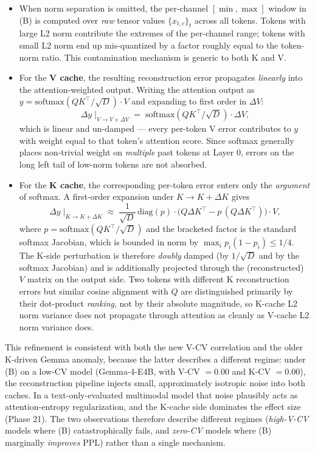\begin{itemize}
\tightlist
\item
  When norm separation is omitted, the per-channel \([\min, \max]\)
  window in (B) is computed over \emph{raw} tensor values
  \(\{x_{t, c}\}_{t}\) across all tokens. Tokens with large L2 norm
  contribute the extremes of the per-channel range; tokens with small L2
  norm end up mis-quantized by a factor roughly equal to the token-norm
  ratio. This contamination mechanism is generic to both K and V.
\item
  For the \textbf{V cache}, the resulting reconstruction error
  propagates \emph{linearly} into the attention-weighted output. Writing
  the attention output as
  \(y = \mathrm{softmax}(QK^\top / \sqrt{D}) \cdot V\) and expanding to
  first order in \(\Delta V\): \[
  \Delta y \;\big|_{V \to V + \Delta V} \;=\; \mathrm{softmax}(QK^\top / \sqrt{D}) \cdot \Delta V,
  \] which is linear and un-damped --- every per-token V error
  contributes to \(y\) with weight equal to that token's attention
  score. Since softmax generally places non-trivial weight on
  \emph{multiple} past tokens at Layer 0, errors on the long left tail
  of low-norm tokens are not absorbed.
\item
  For the \textbf{K cache}, the corresponding per-token error enters
  only the \emph{argument} of softmax. A first-order expansion under
  \(K \to K + \Delta K\) gives \[
  \Delta y \;\big|_{K \to K + \Delta K} \;\approx\; \frac{1}{\sqrt{D}}\,\mathrm{diag}(p) \cdot \bigl(Q \Delta K^\top - p\,(Q \Delta K^\top)\bigr) \cdot V,
  \] where \(p = \mathrm{softmax}(QK^\top / \sqrt{D})\) and the
  bracketed factor is the standard softmax Jacobian, which is bounded in
  norm by \(\max_i p_i (1 - p_i) \leq 1/4\). The K-side perturbation is
  therefore \emph{doubly} damped (by \(1/\sqrt{D}\) and by the softmax
  Jacobian) and is additionally projected through the (reconstructed)
  \(V\) matrix on the output side. Two tokens with different K
  reconstruction errors but similar cosine alignment with \(Q\) are
  distinguished primarily by their dot-product \emph{ranking}, not by
  their absolute magnitude, so K-cache L2 norm variance does not
  propagate through attention as cleanly as V-cache L2 norm variance
  does.
\end{itemize}

This refinement is consistent with both the new V-CV correlation and the
older K-driven Gemma anomaly, because the latter describes a different
regime: under (B) on a low-CV model (Gemma-4-E4B, with V-CV \(= 0.00\)
and K-CV \(= 0.00\)), the reconstruction pipeline injects small,
approximately isotropic noise into both caches. In a text-only-evaluated
multimodal model that noise plausibly acts as attention-entropy
regularization, and the K-cache side dominates the effect size (Phase
21). The two observations therefore describe different regimes
(\emph{high-V-CV} models where (B) catastrophically fails, and
\emph{zero-CV} models where (B) marginally \emph{improves} PPL) rather
than a single mechanism.

